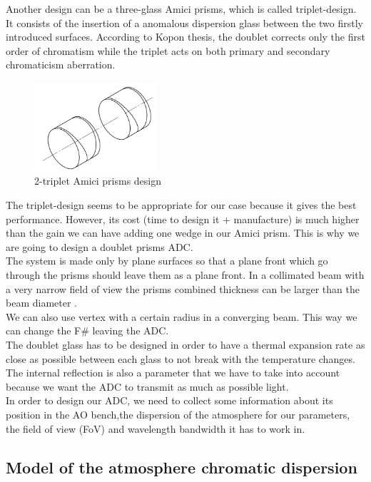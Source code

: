 Another design can be a three-glass Amici prisms, which is called triplet-design. It consists of the insertion of a anomalous dispersion glass between the two firstly introduced surfaces. According to Kopon thesis\cite{KCG}, the doublet corrects only the first order of chromatism while the triplet acts on both primary and secondary chromaticism aberration.
\begin{figure}[H]
\centering
	\includegraphics[width = 0.4\textwidth]{images/tripletDesignISO.png}
	\caption{2-triplet Amici prisms design \cite{KCG}}
	\centering
\end{figure}

The triplet-design seems to be appropriate for our case because it gives the best performance. However, its cost (time to design it + manufacture) is much higher than the gain we can have adding one wedge in our Amici prism. This is why we are going to design a doublet prisms ADC.\\

The system is made only by plane surfaces so that a plane front which go through the prisms should leave them as a plane front. In a collimated beam with a very narrow field of view the prisms combined thickness can be larger than the beam diameter \cite{Wynne1992}.\\
We can also use vertex with a certain radius in a converging beam. This way we can change the F\# leaving the ADC.\\
The doublet glass has to be designed in order to have a thermal expansion rate as close as possible between each glass to not break with the temperature changes. The internal reflection is also a parameter that we have to take into account because we want the ADC to transmit as much as possible light.\\

In order to design our ADC, we need to collect some information about its position in the AO bench,the dispersion of the atmosphere for our parameters, the field of view (FoV) and wavelength bandwidth it has to work in.

\subsection{Model of the atmosphere chromatic dispersion}

